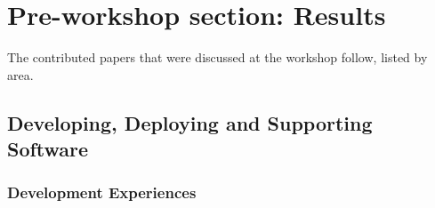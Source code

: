 \documentclass[11pt, oneside]{amsart}
\begin{document}
\section{Pre-workshop section: Results}

The contributed papers that were discussed at the workshop follow, listed by area.

\subsection{Developing, Deploying and Supporting Software}

\subsubsection{Development Experiences}
\end{document}
